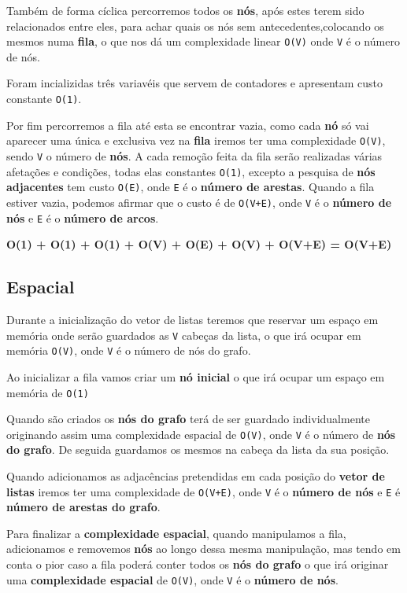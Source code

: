 \documentclass[11pt]{article}
\begin{document}
Também de forma cíclica percorremos todos os \textbf{nós}, após estes terem sido relacionados entre eles, para
achar quais os nós sem antecedentes,colocando os mesmos numa \textbf{fila}, o que nos dá um complexidade
linear \verb|O(V)| onde \verb|V| é o número de nós.

Foram incializidas três variavéis que servem de contadores e apresentam custo constante \verb|O(1)|.

Por fim percorremos a fila até esta se encontrar vazia, como cada \textbf{nó} só vai aparecer uma única e
exclusiva vez na \textbf{fila} iremos ter uma complexidade \verb|O(V)|, sendo \verb|V| o número de
\textbf{nós}. A cada remoção feita da fila serão realizadas várias afetações e condições, todas elas
constantes \verb|O(1)|, excepto a pesquisa de \textbf{nós adjacentes} tem custo \verb|O(E)|, onde
\verb|E| é o \textbf{número de arestas}. Quando a fila estiver vazia, podemos afirmar que o custo é
de \verb|O(V+E)|, onde \verb|V| é o \textbf{número de nós} e \verb|E| é o \textbf{número de arcos}.

\begin{center}
    \textbf{O(1) + O(1) + O(1) + O(V) + O(E) + O(V) + O(V+E) = O(V+E)}
\end{center}

\subsection{Espacial}

\hspace{0,5cm}Durante a inicialização do vetor de listas teremos que reservar um espaço em memória onde
serão guardados as \verb|V| cabeças da lista, o que irá ocupar em memória \verb|O(V)|, onde
\verb|V| é o número de nós do grafo.

Ao inicializar a fila vamos criar um \textbf{nó inicial} o que irá ocupar um espaço em memória de \verb|O(1)|

Quando são criados os \textbf{nós do grafo} terá de ser guardado individualmente originando assim uma
complexidade espacial de \verb|O(V)|, onde \verb|V| é o número de \textbf{nós do grafo}. 
De seguida guardamos os mesmos na cabeça da lista da sua posição.

Quando adicionamos as adjacências pretendidas em cada posição do \textbf{vetor de listas} iremos ter uma
complexidade de \verb|O(V+E)|, onde \verb|V| é o \textbf{número de nós} e \verb|E| é \textbf{número de
arestas do grafo}.

Para finalizar a \textbf{complexidade espacial}, quando manipulamos a fila, adicionamos e removemos \textbf{nós}
ao longo dessa mesma manipulação, mas tendo em conta o pior caso a fila poderá conter todos os \textbf{nós
do grafo} o que irá originar uma \textbf{complexidade espacial} de \verb|O(V)|, onde \verb|V| é o
\textbf{número de nós}.
\end{document}
